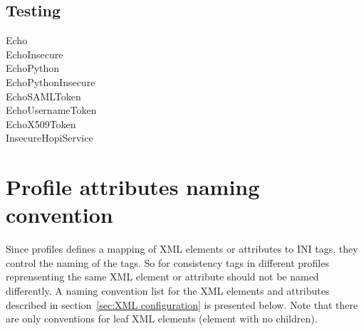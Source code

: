 \documentclass{article}
\begin{document}
\subsection{Testing}
\begin{description}
\item[Echo]
\item[EchoInsecure]
\item[EchoPython]
\item[EchoPythonInsecure]
\item[EchoSAMLToken]
\item[EchoUsernameToken]
\item[EchoX509Token]
\item[InsecureHopiService]
\end{description}

\section{Profile attributes naming convention}
Since profiles defines a mapping of XML elements or attributes to INI tags, they
control the naming of the tags. So for consistency tags in different profiles
reprensenting the same XML element or attribute should not be named differently.
A naming convention list for the XML elements and attributes described in
section~\ref{sec:XML configuration} is presented below. Note that there are only
conventions for leaf XML elements (element with no children).
\end{document}
